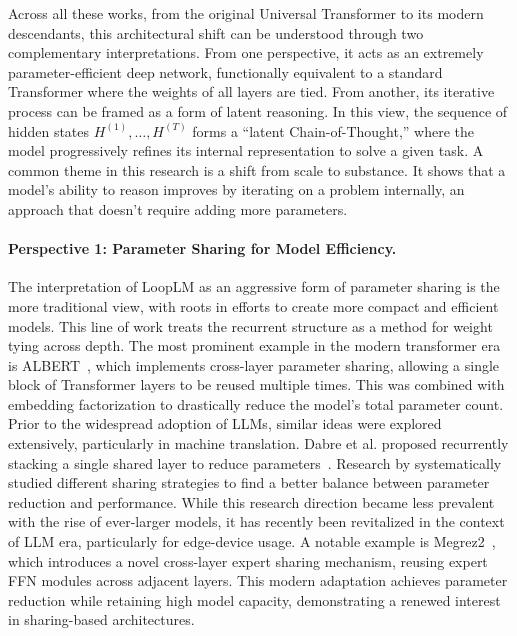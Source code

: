 \documentclass[]{bytedance_seed}
\newcommand{\1}{\mathbf{1}}
\newcommand{\ut}{LoopLM}
\begin{document}
Across all these works, from the original Universal Transformer to its modern descendants, this architectural shift can be understood through two complementary interpretations. From one perspective, it acts as an extremely parameter-efficient deep network, functionally equivalent to a standard Transformer where the weights of all layers are tied. From another, its iterative process can be framed as a form of latent reasoning. In this view, the sequence of hidden states $H^{(1)}, \dots, H^{(T)}$ forms a ``latent Chain-of-Thought,'' where the model progressively refines its internal representation to solve a given task. A common theme in this research is a shift from scale to substance. It shows that a model's ability to reason improves by iterating on a problem internally, an approach that doesn't require adding more parameters.

\paragraph{Perspective 1: Parameter Sharing for Model Efficiency.}
The interpretation of \ut{} as an aggressive form of parameter sharing is the more traditional view, with roots in efforts to create more compact and efficient models. This line of work treats the recurrent structure as a method for weight tying across depth. The most prominent example in the modern transformer era is ALBERT~\cite{lan2019albert}, which implements cross-layer parameter sharing, allowing a single block of Transformer layers to be reused multiple times. This was combined with embedding factorization to drastically reduce the model's total parameter count. Prior to the widespread adoption of LLMs, similar ideas were explored extensively, particularly in machine translation. Dabre et al. proposed recurrently stacking a single shared layer to reduce parameters~\cite{dabre2019recurrent}.  Research by \cite{takase2021lessons} systematically studied different sharing strategies to find a better balance between parameter reduction and performance. While this research direction became less prevalent with the rise of ever-larger models, it has recently been revitalized in the context of LLM era, particularly for edge-device usage. A notable example is Megrez2~\cite{li2025megrez2}, which introduces a novel cross-layer expert sharing mechanism, reusing expert FFN modules across adjacent layers. This modern adaptation achieves parameter reduction while retaining high model capacity, demonstrating a renewed interest in sharing-based architectures.
\end{document}
